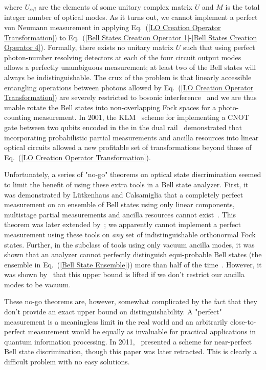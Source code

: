\documentclass[aps,pra,twocolumn,showpacs,superscriptaddress,floatfix,10pt]{revtex4}
\begin{document}
where $U_{\alpha \beta}$ are the elements of some unitary complex matrix $U$ and $M$ is the total integer number of optical modes. As it turns out, we cannot implement a perfect von Neumann measurement in applying Eq.~(\ref{LO Creation Operator Transformation}) to Eq.~(\ref{Bell States Creation Operator 1}-\ref{Bell States Creation Operator 4}). Formally, there exists no unitary matrix $U$ such that using perfect photon-number resolving detectors at each of the four circuit output modes allows a perfectly unambiguous measurement; at least two of the Bell states will always be indistinguishable. The crux of the problem is that linearly accessible entangling operations between photons allowed by Eq.~(\ref{LO Creation Operator Transformation}) are severely restricted to bosonic interference~\cite{Review Paper} and we are thus unable rotate the Bell states into non-overlapping Fock spaces for a photo-counting measurement. In 2001, the KLM~\cite{KLM,KLM2} scheme for implementing a CNOT gate between two qubits encoded in the in the dual rail~\cite{Review Paper} demonstrated that incorporating probabilistic partial measurements and ancilla resources into linear optical circuits allowed a new profitable set of transformations beyond those of Eq.~(\ref{LO Creation Operator Transformation}). 

Unfortunately, a series of "no-go" theorems on optical state discrimination seemed to limit the benefit of using these extra tools in a Bell state analyzer. First, it was demonstrated by L\"utkenhaus and Calsamiglia that a completely perfect measurement on an ensemble of Bell states using only linear components, multistage partial measurements and ancilla resources cannot exist~\cite{Lutkenhaus}. This theorem was later extended by~\cite{Carollo}; we apparently cannot implement a perfect measurement using these tools on \textit{any} set of indistinguishable orthonormal Fock states. Further, in the subclass of tools using only vacuum ancilla modes, it was shown that an analyzer cannot perfectly distinguish equi-probable Bell states (the ensemble in Eq.~(\ref{Bell State Ensemble})) more than half of the time~\cite{Calsamiglia}. However, it was shown by~\cite{Ewert} that this upper bound is lifted if we don't restrict our ancilla modes to be vacuum.

These no-go theorems are, however, somewhat complicated by the fact that they don't provide an exact upper bound on distinguishability. A "perfect" measurement is a meaningless limit in the real world and an arbitrarily close-to-perfect measurement would be  equally as invaluable for practical applications in quantum information processing. In 2011,~\cite{Pavicic} presented a scheme for near-perfect Bell state discrimination, though this paper was later retracted. This is clearly a difficult problem with no easy solutions.
\end{document}
